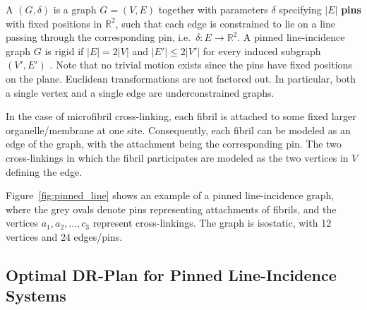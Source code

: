 A  $(G,\delta)$ is a graph $G=(V,E)$ together with parameters $\delta$ specifying $|E|$ \textbf{pins} with fixed positions in $\mathbb{R}^2$, such that each edge is constrained to lie on a line passing through the corresponding pin, i.e.\ $\delta: E \rightarrow \mathbb{R}^2$.
%
%
A pinned line-incidence graph $G$ is rigid if $|E| = 2|V|$ and $|E'| \le 2|V'|$ for every induced subgraph $(V',E')$ \cite{sitharam2014incidence}. Note that no trivial motion exists since the pins have fixed positions on the plane. Euclidean transformations are not factored out. In particular, both a single vertex and a single edge are underconstrained graphs.




In the case of microfibril cross-linking, each fibril is attached to some fixed larger organelle/membrane at one site. Consequently, each fibril can be modeled as an edge of the graph, with the attachment being the corresponding pin. The two cross-linkings in which the fibril participates are modeled as the two vertices in $V$ defining the edge.



Figure~\ref{fig:pinned_line} shows an example of a pinned line-incidence graph, where the grey ovals denote pins representing attachments of fibrils, and the vertices $a_1,a_2,\ldots, c_3$ represent cross-linkings.
The graph is isostatic, with 12 vertices and 24 edges/pins.



\subsection{Optimal DR-Plan for Pinned Line-Incidence Systems}


